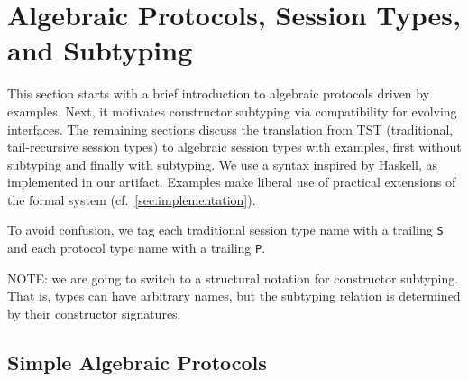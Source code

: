 \section{Algebraic Protocols, Session Types, and Subtyping}
\label{sec:algebr-sess-types}

This section starts with a brief introduction to algebraic protocols
driven by examples. Next, it motivates constructor subtyping via
compatibility for evolving interfaces. The remaining sections discuss
the translation from TST (traditional, tail-recursive session types)
to algebraic session types with examples, first without subtyping and
finally with subtyping. We use a
syntax inspired by Haskell, as implemented in our artifact. Examples make
liberal use of practical extensions of the formal system (cf.\ \cref{sec:implementation}).

To avoid confusion, we tag each traditional session type name with a
trailing \lstinline+S+ and each protocol type name with a trailing \lstinline+P+.

NOTE: we are going to switch to a structural notation for constructor
subtyping. That is, types can have arbitrary names, but the subtyping
relation is determined by their constructor signatures.

\subsection{Simple Algebraic Protocols}
\label{sec:algebr-datatyp-as}

